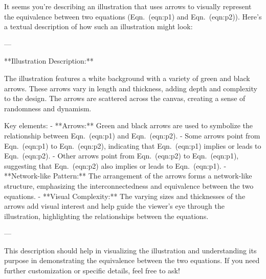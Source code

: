 It seems you're describing an illustration that uses arrows to visually represent the equivalence between two equations (Eqn.~(eqn:p1) and Eqn.~(eqn:p2)). Here's a textual description of how such an illustration might look:

---

**Illustration Description:**

The illustration features a white background with a variety of green and black arrows. These arrows vary in length and thickness, adding depth and complexity to the design. The arrows are scattered across the canvas, creating a sense of randomness and dynamism.

Key elements:
- **Arrows:** Green and black arrows are used to symbolize the relationship between Eqn.~(eqn:p1) and Eqn.~(eqn:p2).
  - Some arrows point from Eqn.~(eqn:p1) to Eqn.~(eqn:p2), indicating that Eqn.~(eqn:p1) implies or leads to Eqn.~(eqn:p2).
  - Other arrows point from Eqn.~(eqn:p2) to Eqn.~(eqn:p1), suggesting that Eqn.~(eqn:p2) also implies or leads to Eqn.~(eqn:p1).
- **Network-like Pattern:** The arrangement of the arrows forms a network-like structure, emphasizing the interconnectedness and equivalence between the two equations.
- **Visual Complexity:** The varying sizes and thicknesses of the arrows add visual interest and help guide the viewer’s eye through the illustration, highlighting the relationships between the equations.

---

This description should help in visualizing the illustration and understanding its purpose in demonstrating the equivalence between the two equations. If you need further customization or specific details, feel free to ask!